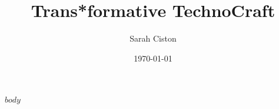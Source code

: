 \documentclass[10pt,oneside]{scrartcl}
\title{Trans*formative TechnoCraft}
\author{Sarah Ciston}
\date{\today}
\begin{document}
\maketitle
\renewcommand{\contentsname}{Table of Contents}
\tableofcontents
\listoffigures

\newpage


$body$
\end{document}
